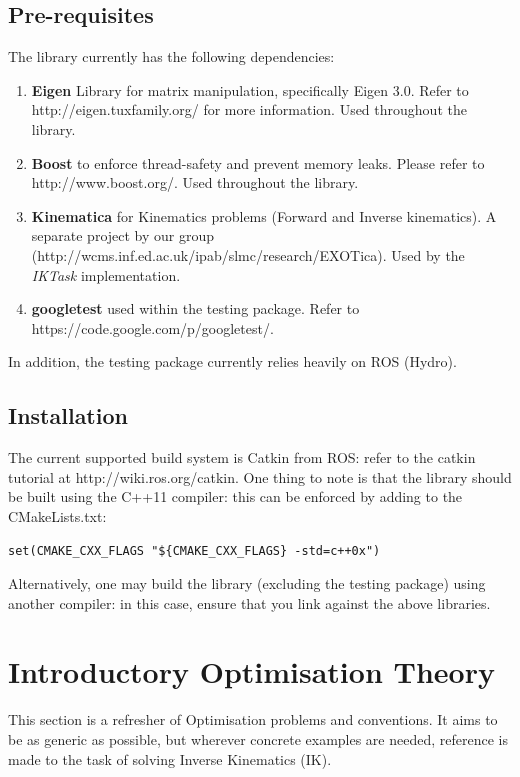 \documentclass[12pt,a4paper,onecolumn]{article}
\begin{document}
\subsection{Pre-requisites}
The library currently has the following dependencies:
\begin{enumerate}
\item \textbf{Eigen} Library for matrix manipulation, specifically Eigen 3.0. Refer to http://eigen.tuxfamily.org/ for more information. Used throughout the library.
\item \textbf{Boost} to enforce thread-safety and prevent memory leaks. Please refer to http://www.boost.org/. Used throughout the library.
\item \textbf{Kinematica} for Kinematics problems (Forward and Inverse kinematics). A separate project by our group (http://wcms.inf.ed.ac.uk/ipab/slmc/research/EXOTica). Used by the \textit{IKTask} implementation.
\item \textbf{googletest} used within the testing package. Refer to https://code.google.com/p/googletest/.
\end{enumerate}
In addition, the testing package currently relies heavily on ROS (Hydro).


\subsection{Installation}
The current supported build system is Catkin from ROS: refer to the catkin tutorial at http://wiki.ros.org/catkin. One thing to note is that the library should be built using the C++11 compiler: this can be enforced by adding to the CMakeLists.txt:
\begin{verbatim}
set(CMAKE_CXX_FLAGS "${CMAKE_CXX_FLAGS} -std=c++0x")
\end{verbatim}

\noindent Alternatively, one may build the library (excluding the testing package) using another compiler: in this case, ensure that you link against the above libraries.

\newpage
\section{Introductory Optimisation Theory}
\label{OPTIMISATION_THEORY}
This section is a refresher of Optimisation problems and conventions. It aims to be as generic as possible, but wherever concrete examples are needed, reference is made to the task of solving Inverse Kinematics (IK).
\end{document}

